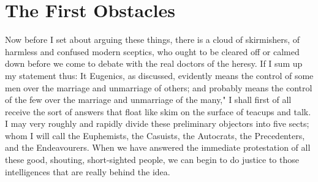 \documentclass{book}
\begin{document}
\chapter{The First Obstacles}
\label{chapter-3}
Now before I set about arguing these things, there is a cloud of skirmishers, of harmless and confused modern sceptics, who ought to be cleared off or calmed down before we come to debate with the real doctors of the heresy. If I sum up my statement thus: It Eugenics, as discussed, evidently means the control of some men over the marriage and unmarriage of others; and probably means the control of the few over the marriage and unmarriage of the many," I shall first of all receive the sort of answers that float like skim on the surface of teacups and talk. I may very roughly and rapidly divide these preliminary objectors into five sects; whom I will call the Euphemists, the Casuists, the Autocrats, the Precedenters, and the Endeavourers. When we have answered the immediate protestation of all these good, shouting, short-sighted people, we can begin to do justice to those intelligences that are really behind the idea.
\end{document}
